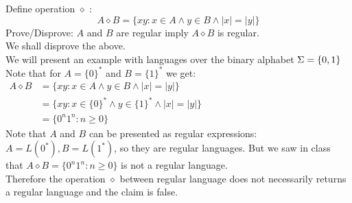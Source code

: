 Define operation $\diamond$ :
\[
    A \diamond B = \{xy : x \in A \wedge y \in B \wedge |x| = |y|\}
\]
Prove/Disprove: $A$ and $B$ are regular imply $A \diamond B$ is regular. \\

We shall disprove the above. \\
We will present an example with languages over the binary alphabet $\Sigma = \{0, 1\}$ \\
Note that for $A=\{0\}^*$ and $B=\{1\}^*$ we get: \\
$
    \begin{aligned}
        A \diamond B & = \{xy : x \in A \wedge y \in B \wedge |x| = |y|\}             \\
                     & = \{xy : x \in \{0\}^* \wedge y \in \{1\}^* \wedge |x| = |y|\} \\
                     & = \{0^n 1^n : n \geq 0\}
    \end{aligned}
$ \\
Note that $A$ and $B$ can be presented as regular expressions: $A=L(0^*), B=L(1^*)$,
so they are regular languages. But we saw in class that $A \diamond B =\{0^n 1^n : n \geq 0\}$
is not a regular language. \\
Therefore the operation $\diamond$ between regular language does not necessarily
returns a regular language and the claim is false. \\